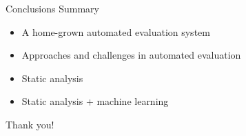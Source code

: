 \documentclass{beamer}
\begin{document}
\begin{frame}[fragile]{Conclusions}
{Summary}

\begin{itemize}
\item A home-grown automated evaluation system
\item Approaches and challenges in automated evaluation
\item Static analysis
\item Static analysis + machine learning
\end{itemize}
\end{frame}


\begin{frame}[fragile]{Thank you!}
\end{frame}
\end{document}
